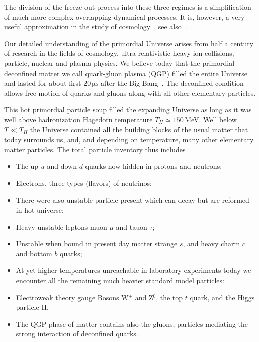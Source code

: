 The division of the freeze-out process into these three regimes is a simplification of much more complex overlapping dynamical processes. It is, however, a very useful approximation in the study of cosmology~\cite{Mangano:2005cc,Birrell:2014gea}, see also~\cite{Birrell:2012gg,Rafelski:2023emw}.

Our detailed understanding of the primordial Universe arises from half a century of research in the fields of cosmology, ultra relativistic heavy ion collisions, particle, nuclear and plasma physics. We believe today that the primordial deconfined matter we call quark-gluon plasma (QGP) filled the entire Universe and lasted for about first $20\,\mathrm{\mu s}$ after the Big Bang~. The deconfined condition allows free motion of quarks and gluons along with all other elementary particles. 

This hot primordial particle soup filled the expanding Universe as long as it was well above hadronization Hagedorn temperature $T_H\simeq 150$\,MeV. Well below $T\ll T_H$ the Universe contained all the building blocks of the usual matter that today surrounds us, and, and depending on temperature, many other elementary matter particles. The total particle inventory thus includes
\begin{itemize}
\item The up $u$ and down $d$ quarks now hidden in protons and neutrons;
\item Electrons, three types (flavors) of neutrinos;
\item[] There were also unstable particle present which can decay but are reformed in hot universe:
\item Heavy unstable leptons muon $\mu$ and tauon $\tau$;
\item Unstable when bound in present day matter strange $s$, and heavy charm $c$ and bottom $b$ quarks;
\item[] At yet higher temperatures unreachable in laboratory experiments today we encounter all the remaining much heavier standard model particles: 
\item Electroweak theory gauge Bosons W$^\pm$ and Z$^0$, the top $t$ quark, and the Higgs particle H.
\item The QGP phase of matter contains also the gluons, particles mediating the strong interaction of deconfined quarks.
\end{itemize}

